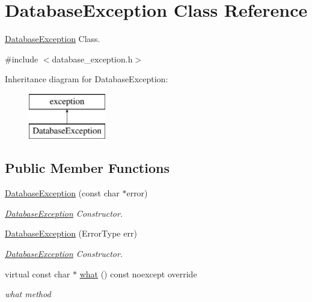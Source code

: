 \hypertarget{class_database_exception}{}\section{Database\+Exception Class Reference}
\label{class_database_exception}


\hyperlink{class_database_exception}{Database\+Exception} Class.  




{\ttfamily \#include $<$database\+\_\+exception.\+h$>$}

Inheritance diagram for Database\+Exception\+:\begin{figure}[H]
\begin{center}
\leavevmode
\includegraphics[height=2.000000cm]{class_database_exception}
\end{center}
\end{figure}
\subsection*{Public Member Functions}
\begin{DoxyCompactItemize}
\item 
\hyperlink{class_database_exception_a2a1031ccc2c355474552df6cfe368583}{Database\+Exception} (const char $\ast$error)
\begin{DoxyCompactList}\small\item\em \hyperlink{class_database_exception}{Database\+Exception} Constructor. \end{DoxyCompactList}\item 
\hyperlink{class_database_exception_a4c11217be7b22d7a2f56fd81fc82d4cd}{Database\+Exception} (Error\+Type err)
\begin{DoxyCompactList}\small\item\em \hyperlink{class_database_exception}{Database\+Exception} Constructor. \end{DoxyCompactList}\item 
virtual const char $\ast$ \hyperlink{class_database_exception_a75c0ac2e93f46c82d22892aac334d854}{what} () const noexcept override
\begin{DoxyCompactList}\small\item\em what method \end{DoxyCompactList}\end{DoxyCompactItemize}


